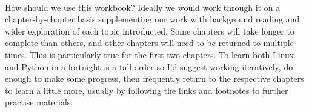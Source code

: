 
\paragraph{} How should we use this workbook? Ideally we would work through it on a chapter-by-chapter basis supplementing our work with background reading and wider exploration of each topic introducted. Some chapters will take longer to complete than others, and other chapters will need to be returned to multiple times. This is particularly true for the first two chapters. To learn both Linux and Python in a fortnight is a tall order so I'd suggest working iteratively, do enough to make some progress, then frequently return to the respective chapters to learn a little more, usually by following the links and footnotes to further practise materials.

